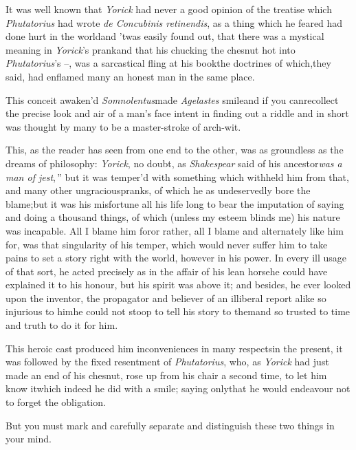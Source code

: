 \documentclass{article}
\begin{document}
It was well known that \textit{Yorick} had never a good opinion of
the treatise which\break
\textit{Phutatorius} had wrote \textit{de Concubinis
retinendis}, as a thing which he feared had done hurt in the
world\tsk and ’twas easily found out, that there was a
mystical meaning in \textit{Yorick}’s prank\tsk and that his
chucking the chesnut hot into \textit{Phutatorius}’s
\hbox{–}, 
was a sarcastical fling at his book\tsk the doctrines
of which,\break they said, had enflamed many an honest man in the
same place.

This conceit awaken’d \textit{Somnolentus}\tsh made
\textit{Agelastes} smile\tsk and if you can\break recollect the
precise look and air of a man’s face intent in finding out a
riddle\tsk{} and in short was thought by many to be a master-stroke
of arch-wit.

This, as the reader has seen from one end to the other, was as
groundless as the dreams of philosophy: \textit{Yorick}, no doubt, as
\textit{Shakespear} said of his ancestor\break\tsk\lqq\textit{was
a man of jest},\,” but it was temp\-er’d with something
which withheld him from that, and many other ungracious\break pranks, of
which he as undeservedly\break
bore the blame;\tsk but it was his
misfortune all his life long to bear the imputation of saying and
doing a thousand things, of which (unless my esteem blinds me) his
nature was incapable. All I
blame him for\tsk or rather, all I blame and alternately like him for, was that
singularity of his temper, which would never suffer him to take pains to set a story
right with the world, however in his power. In every ill usage of that sort, he
acted precisely as in the affair of his lean horse\tsk he could have explained it to
his honour, but his spirit was above it; and besides, he ever looked upon the
inventor, the propagator and believer of an illiberal report alike so injurious to
him\tsk he could not stoop to tell his story to them\tsk and so trusted to time and
truth to do it for him.

This heroic cast produced him inconveniences in many
respects\tsk in the pre\-sent, it was followed by the fixed
resentment of \textit{Phutatorius}, who, as \textit{Yorick} had just
made an end of his chesnut, rose up from his chair a second time,
to let him know it\tsk which indeed he did with a smile; saying
only\tsk that he would endeavour not to forget the
obligation.

But you must mark and carefully separate and distinguish these
two things in your mind.
\end{document}
